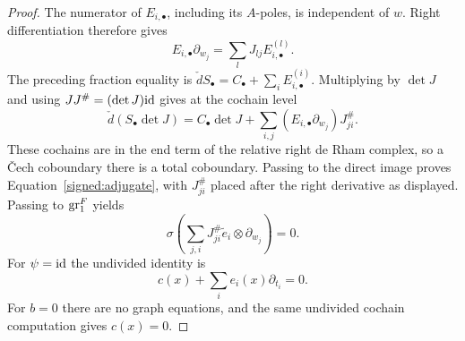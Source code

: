 \begin{proof}
The numerator of \(E_{i,\bullet}\), including its \(A\)-poles,
is independent of \(w\).  Right differentiation therefore gives
\[
 E_{i,\bullet}\partial_{w_j}=\sum_lJ_{lj}E_{i,\bullet}^{(l)}.
\]
The preceding fraction equality is
\(\check dS_\bullet=C_\bullet+\sum_iE_{i,\bullet}^{(i)}\).
Multiplying by \(\det J\) and using \(JJ^\#=(\det J)\mathrm{id}\)
gives at the cochain level
\[
 \check d(S_\bullet\det J)=C_\bullet\det J+
 \sum_{i,j}(E_{i,\bullet}\partial_{w_j})J^\#_{ji}.
\]
These cochains are in the end term of the relative right de
Rham complex, so a Čech coboundary there is a total
coboundary.  Passing to the direct image proves
Equation~\eqref{signed:adjugate}, with \(J^\#_{ji}\) placed
after the right derivative as displayed.  Passing to
\(\operatorname{gr}^F_1\) yields
\begin{equation}\label{signed:local-symbol}
 \sigma\left(\sum_{j,i}J^\#_{ji}\widetilde e_i
                         \otimes\partial_{w_j}\right)=0.
\end{equation}
For \(\psi=\mathrm{id}\) the undivided identity is
\begin{equation}\label{signed:undivided}
 c(x)+\sum_i e_i(x)\partial_{t_i}=0.
\end{equation}
For \(b=0\) there are no graph equations, and the same
undivided cochain computation gives \(c(x)=0\).


\end{proof}
